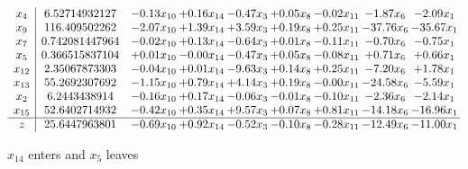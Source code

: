 \documentclass[9pt]{article}
\begin{document}
 \[\begin{array}{c| c c@{\hskip 2pt} c@{\hskip 2pt} c@{\hskip 2pt} c@{\hskip 2pt} c@{\hskip 2pt} c@{\hskip 2pt} c@{\hskip 2pt} }
 x_{4}   &  6.52714932127 & -0.13 x_{10} & +  0.16 x_{14} & -0.47 x_{3} & +  0.05 x_{8} & -0.02 x_{11} & -1.87 x_{6} & -2.09 x_{1}\\
 x_{9}   &  116.409502262 & -2.07 x_{10} & +  1.39 x_{14} & +  3.59 x_{3} & +  0.19 x_{8} & +  0.25 x_{11} & -37.76 x_{6} & -35.67 x_{1}\\
 x_{7}   &  0.742081447964 & -0.02 x_{10} & +  0.13 x_{14} & -0.64 x_{3} & +  0.01 x_{8} & -0.11 x_{11} & -0.70 x_{6} & -0.75 x_{1}\\
 x_{5}   &  0.366515837104 & +  0.01 x_{10} & -0.00 x_{14} & -0.47 x_{3} & +  0.05 x_{8} & -0.08 x_{11} & +  0.71 x_{6} & +  0.66 x_{1}\\
 x_{12}   &  2.35067873303 & -0.04 x_{10} & +  0.01 x_{14} & -9.63 x_{3} & +  0.14 x_{8} & +  0.25 x_{11} & -7.20 x_{6} & +  1.78 x_{1}\\
 x_{13}   &  55.2692307692 & -1.15 x_{10} & +  0.79 x_{14} & +  4.14 x_{3} & +  0.19 x_{8} & -0.00 x_{11} & -24.58 x_{6} & -5.59 x_{1}\\
 x_{2}   &  6.2443438914 & -0.16 x_{10} & +  0.17 x_{14} & -0.06 x_{3} & -0.01 x_{8} & -0.10 x_{11} & -2.36 x_{6} & -2.14 x_{1}\\
 x_{15}   &  52.6402714932 & -0.42 x_{10} & +  0.35 x_{14} & +  9.57 x_{3} & +  0.07 x_{8} & +  0.81 x_{11} & -14.18 x_{6} & -16.96 x_{1}\\
\hline
z    &  25.6447963801 & -0.69 x_{10} & +  0.92 x_{14} & -0.52 x_{3} & -0.10 x_{8} & -0.28 x_{11} & -12.49 x_{6} & -11.00 x_{1}\\
\end{array}\]


 $ x_{14} $ enters and $ x_{5} $ leaves 
\end{document}
